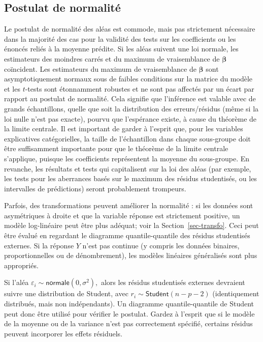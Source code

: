 \documentclass[
  11pt,
  letterpaper,
]{scrbook}
\theoremstyle{plain}
\theoremstyle{plain}
\theoremstyle{definition}
\theoremstyle{definition}
\theoremstyle{remark}
\begin{document}
\subsection{Postulat de normalité}\label{postulat-de-normalituxe9}

Le postulat de normalité des aléas est commode, mais pas strictement
nécessaire dans la majorité des cas pour la validité des tests sur les
coefficients ou les énoncés reliés à la moyenne prédite. Si les aléas
suivent une loi normale, les estimateurs des moindres carrés et du
maximum de vraisemblance de \(\boldsymbol{\beta}\) coïncident. Les
estimateurs du maximum de vraisemblance de \(\boldsymbol{\beta}\) sont
asymptotiquement normaux sous de faibles conditions sur la matrice du
modèle et les \(t\)-tests sont étonnamment robustes et ne sont pas
affectés par un écart par rapport au postulat de normalité. Cela
signifie que l'inférence est valable avec de grands échantillons, quelle
que soit la distribution des erreurs/résidus (même si la loi nulle n'est
pas exacte), pourvu que l'espérance existe, à cause du théorème de la
limite centrale. Il est important de garder à l'esprit que, pour les
variables explicatives catégorielles, la taille de l'échantillon dans
chaque sous-groupe doit être suffisamment importante pour que le
théorème de la limite centrale s'applique, puisque les coefficients
représentent la moyenne du sous-groupe. En revanche, les résultats et
tests qui capitalisent sur la loi des aléas (par exemple, les tests pour
les aberrances basés sur le maximum des résidus studentisés, ou les
intervalles de prédictions) seront probablement trompeurs.

Parfois, des transformations peuvent améliorer la normalité : si les
données sont asymétriques à droite et que la variable réponse est
strictement positive, un modèle log-linéaire peut être plus adéquat;
voir la Section~\ref{sec-transfo}. Ceci peut être évalué en regardant le
diagramme quantile-quantile des résidus studentisés externes. Si la
réponse \(Y\) n'est pas continue (y compris les données binaires,
proportionnelles ou de dénombrement), les modèles linéaires généralisés
sont plus appropriés.

Si l'aléa \(\varepsilon_i \sim \mathsf{normale}(0, \sigma^2),\) alors
les résidus studentisés externes devraient suivre une distribution de
Student, avec \(r_i \sim \mathsf{Student}(n-p-2)\) (identiquement
distribués, mais non indépendants). Un diagramme quantile-quantile de
Student peut donc être utilisé pour vérifier le postulat. Gardez à
l'esprit que si le modèle de la moyenne ou de la variance n'est pas
correctement spécifié, certains résidus peuvent incorporer les effets
résiduels.
\end{document}

